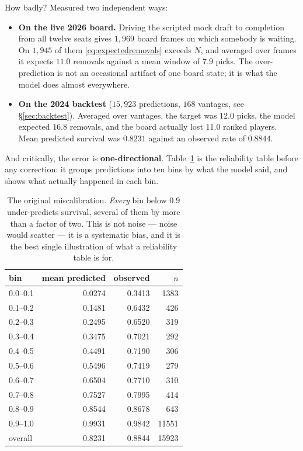 \documentclass[10pt,a4paper]{article}
\theoremstyle{plain}
\theoremstyle{definition}
\theoremstyle{remark}
\begin{document}
How badly? Measured two independent ways:

\begin{itemize}
\item \textbf{On the live 2026 board.} Driving the scripted mock draft to completion from
all twelve seats gives $1{,}969$ board frames on which somebody is waiting. On $1{,}945$
of them \eqref{eq:expectedremovals} exceeds $N$, and averaged over frames it expects
$11.0$ removals against a mean window of $7.9$ picks. The over-prediction is not an
occasional artifact of one board state; it is what the model does almost everywhere.

\item \textbf{On the 2024 backtest} ($15{,}923$ predictions, $168$ vantages, see
\S\ref{sec:backtest}). Averaged over vantages, the target was $12.0$ picks, the model
expected $16.8$ removals, and the board actually lost $11.0$ ranked players. Mean
predicted survival was $0.8231$ against an observed rate of $0.8844$.
\end{itemize}

And critically, the error is \textbf{one-directional}. Table~\ref{tab:premiscal} is the
reliability table before any correction: it groups predictions into ten bins by what the
model said, and shows what actually happened in each bin.

\begin{table}[htbp]
\centering
\small
\begin{tabular}{lrrr}
\toprule
bin & mean predicted & observed & $n$ \\
\midrule
0.0--0.1 & 0.0274 & 0.3413 & 1383 \\
0.1--0.2 & 0.1481 & 0.6432 & 426 \\
0.2--0.3 & 0.2495 & 0.6520 & 319 \\
0.3--0.4 & 0.3475 & 0.7021 & 292 \\
0.4--0.5 & 0.4491 & 0.7190 & 306 \\
0.5--0.6 & 0.5496 & 0.7419 & 279 \\
0.6--0.7 & 0.6504 & 0.7710 & 310 \\
0.7--0.8 & 0.7527 & 0.7995 & 414 \\
0.8--0.9 & 0.8544 & 0.8678 & 643 \\
0.9--1.0 & 0.9931 & 0.9842 & 11551 \\
\midrule
overall & 0.8231 & 0.8844 & 15923 \\
\bottomrule
\end{tabular}
\caption{The original miscalibration. \emph{Every} bin below $0.9$ under-predicts
survival, several of them by more than a factor of two. This is not noise --- noise
would scatter --- it is a systematic bias, and it is the best single illustration of
what a reliability table is for.}
\label{tab:premiscal}
\end{table}
\end{document}
